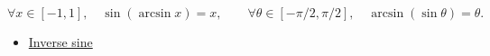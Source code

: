 \begin{remark*}
\[
  \forall x\in[-1,1],\quad \sin(\arcsin x)=x,
  \qquad
  \forall \theta\in[-\pi/2,\pi/2],\quad \arcsin(\sin\theta)=\theta.
\]
\end{remark*}
\begin{dependencies}
\begin{itemize}
  \item \hyperref[def:inverse-sine]{Inverse sine}
\end{itemize}
\end{dependencies}
